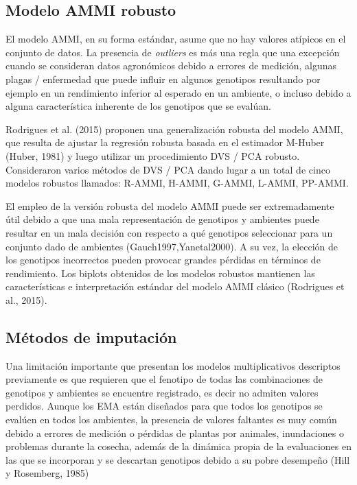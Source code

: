 \subsection{Modelo AMMI robusto}

El modelo AMMI, en su forma estándar, asume que no hay valores atípicos en el conjunto de datos. La presencia de \emph{outliers} es más una regla que una excepción cuando se consideran datos agronómicos debido a errores de medición, algunas plagas / enfermedad que puede influir en algunos genotipos  resultando por ejemplo en un rendimiento inferior al esperado en un ambiente, o incluso debido a alguna característica inherente de los genotipos que se evalúan.

Rodrigues et al. (2015) proponen una generalización robusta del modelo AMMI, que resulta de ajustar la regresión robusta basada en el estimador M-Huber (Huber, 1981) y luego utilizar un procedimiento DVS / PCA robusto. Consideraron varios métodos de DVS / PCA dando lugar a un total de cinco modelos robustos llamados: R-AMMI, H-AMMI, G-AMMI, L-AMMI, PP-AMMI. 

El empleo de la versión robusta del modelo AMMI puede ser extremadamente útil debido a que una mala representación de genotipos y ambientes puede resultar en un mala decisión con respecto a qué genotipos seleccionar para un conjunto dado de ambientes (Gauch1997,Yanetal2000). A su vez, la elección de los genotipos incorrectos pueden provocar grandes pérdidas en términos de rendimiento. Los biplots obtenidos de los modelos robustos mantienen las características e interpretación estándar del modelo AMMI clásico (Rodrigues et al., 2015).


\subsection{Métodos de imputación}


Una limitación importante que presentan los modelos multiplicativos descriptos previamente es que requieren que el fenotipo de todas las combinaciones de genotipos y ambientes se encuentre registrado, es decir no admiten valores perdidos. Aunque los EMA están diseñados para que todos los genotipos se evalúen en todos los ambientes, la presencia de valores faltantes es muy común debido a errores de medición o pérdidas de plantas por animales, inundaciones o problemas durante la cosecha, además de la dinámica propia de la evaluaciones en las que se incorporan y se descartan genotipos debido a su pobre desempeño (Hill y Rosemberg, 1985)


